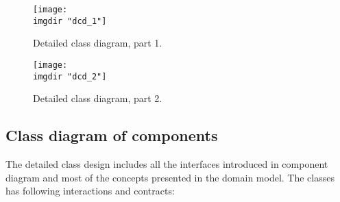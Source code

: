 \begin{figure}
  \centering
  \texttt{[image: \\imgdir "dcd\_1"]}
  \caption{Detailed class diagram, part 1.}
  \label{fig:dcd1}
  \texttt{[image: \\imgdir "dcd\_2"]}
  \caption{Detailed class diagram, part 2.}
  \label{fig:dcd2}
\end{figure}

\subsection{Class diagram of components}
The detailed class design includes all the interfaces introduced in component diagram and most of the concepts presented in the domain model. 
The classes has following interactions and contracts:
\begin{description}


\end{description}
